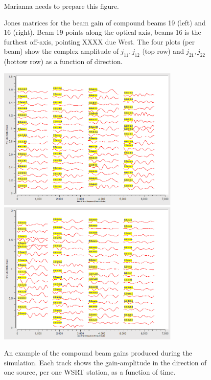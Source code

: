 \documentclass[10pt]{article}
\begin{document}
\begin{figure}
Marianna needs to prepare this figure. 
\caption{\label{fig:jones-matrix}Jones matrices for the beam gain of compound beams 19 (left) and 16 (right).
Beam 19 points along the optical axis, beams 16 is the furthest off-axis, pointing XXXX due West. The four plots (per beam) 
show the complex amplitude of $j_{11},j_{12}$ (top row) and $j_{21},j_{22}$ (bottow row) as a function of direction.
}
\end{figure}


\begin{figure}
\includegraphics[width=9cm]{inspector_gains1}%
\includegraphics[width=9cm]{inspector_gains2} 
\caption{\label{fig:gains}An example of the compound beam gains produced during the simulation. Each track shows the gain-amplitude in the direction of one source, per one WSRT station, as a function of time.}
\end{figure}
\end{document}
